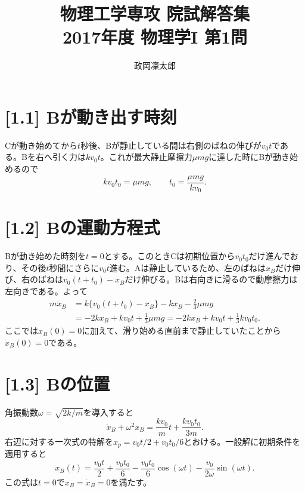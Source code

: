 \documentclass[11pt,a4paper]{article}
\title{物理工学専攻 院試解答集\\2017年度 物理学I 第1問}
\author{政岡凜太郎}
\date{}
\begin{document}
\maketitle

\section*{[1.1] Bが動き出す時刻}
Cが動き始めてから$t$秒後、Bが静止している間は右側のばねの伸びが$v_0t$である。Bを右へ引く力は$kv_0t$。これが最大静止摩擦力$\mu mg$に達した時にBが動き始めるので
\begin{equation}
  kv_0t_0=\mu mg,\qquad
  \boxed{t_0=\frac{\mu mg}{kv_0}}.
\end{equation}

\section*{[1.2] Bの運動方程式}
Bが動き始めた時刻を$t=0$とする。このときCは初期位置から$v_0t_0$だけ進んでおり、その後$t$秒間にさらに$v_0t$進む。Aは静止しているため、左のばねは$x_B$だけ伸び、右のばねは$v_0(t+t_0)-x_B$だけ伸びる。Bは右向きに滑るので動摩擦力は左向きである。よって
\begin{align}
  m\ddot x_B
  &=k\{v_0(t+t_0)-x_B\}-kx_B-\frac23\mu mg\\
  &=-2kx_B+kv_0t+\frac13\mu mg
   =-2kx_B+kv_0t+\frac13kv_0t_0.
\end{align}
ここでは$x_B(0)=0$に加えて、滑り始める直前まで静止していたことから$\dot x_B(0)=0$である。

\section*{[1.3] Bの位置}
角振動数$\omega=\sqrt{2k/m}$を導入すると
\begin{equation}
  \ddot x_B+\omega^2x_B=\frac{k v_0}{m}t+\frac{k v_0t_0}{3m}.
\end{equation}
右辺に対する一次式の特解を$x_p=v_0t/2+v_0t_0/6$とおける。一般解に初期条件を適用すると
\begin{equation}
  \boxed{x_B(t)=\frac{v_0t}{2}+\frac{v_0t_0}{6}
    -\frac{v_0t_0}{6}\cos(\omega t)
    -\frac{v_0}{2\omega}\sin(\omega t)}.
\end{equation}
この式は$t=0$で$x_B=\dot x_B=0$を満たす。
\end{document}
